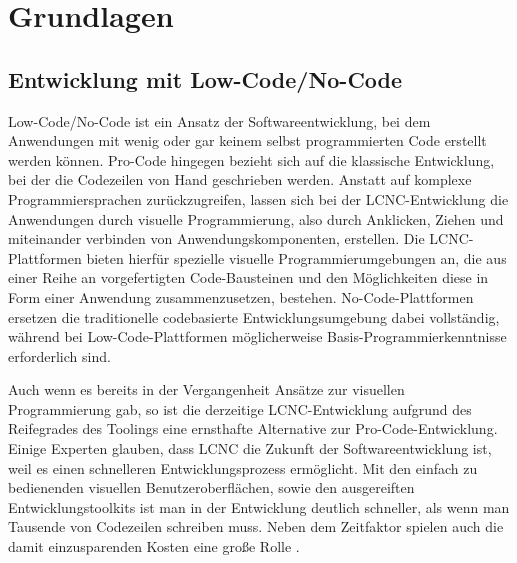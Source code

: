 
\chapter{Grundlagen} \label{GL}

\section{Entwicklung mit Low-Code/No-Code} 

Low-Code/No-Code ist ein Ansatz der Softwareentwicklung, bei dem Anwendungen mit wenig oder gar keinem selbst programmierten Code erstellt werden können. Pro-Code hingegen bezieht sich auf die klassische Entwicklung, bei der die Codezeilen von Hand geschrieben werden. Anstatt auf komplexe Programmiersprachen zurückzugreifen, lassen sich bei der LCNC-Entwicklung die Anwendungen durch visuelle Programmierung, also durch Anklicken, Ziehen und miteinander verbinden von Anwendungskomponenten, erstellen. Die LCNC-Plattformen bieten hierfür spezielle visuelle Programmierumgebungen an, die aus einer Reihe an vorgefertigten Code-Bausteinen und den Möglichkeiten diese in Form einer Anwendung zusammenzusetzen, bestehen. No-Code-Plattformen ersetzen die traditionelle codebasierte Entwicklungsumgebung dabei vollständig, während bei Low-Code-Plattformen möglicherweise Basis-Programmierkenntnisse erforderlich sind.
 
Auch wenn es bereits in der Vergangenheit Ansätze zur visuellen Programmierung gab, so ist die derzeitige LCNC-Entwicklung aufgrund des Reifegrades des Toolings eine ernsthafte Alternative zur Pro-Code-Entwicklung. Einige Experten glauben, dass LCNC die Zukunft der Softwareentwicklung ist, weil es einen schnelleren Entwicklungsprozess ermöglicht. Mit den einfach zu bedienenden visuellen Benutzeroberflächen, sowie den ausgereiften Entwicklungstoolkits ist man in der Entwicklung deutlich schneller, als wenn man Tausende von Codezeilen schreiben muss. Neben dem Zeitfaktor spielen auch die damit einzusparenden Kosten eine große Rolle \cite{lcnc:zlcp}.

